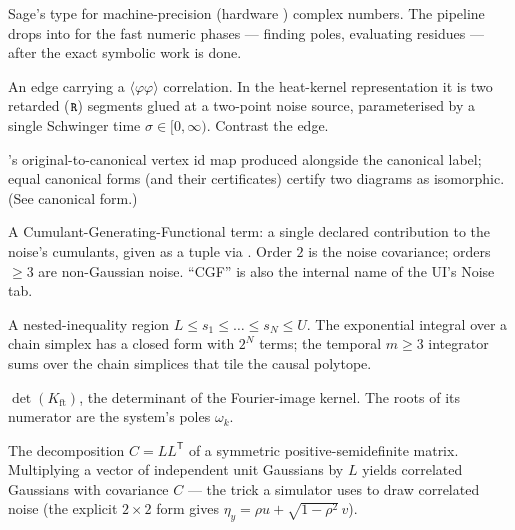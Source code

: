 \begin{description}[leftmargin=0pt,style=nextline]
  \item[\code{CDF} (Complex Double Field)] Sage's type for machine-precision
        (hardware ) complex numbers. The pipeline drops into 
        for the fast numeric phases --- finding poles, evaluating residues --- after
        the exact symbolic work is done.

  \item[\code{C} edge / correlation line] An edge carrying a
        $\langle\varphi\varphi\rangle$ correlation. In the heat-kernel
        representation it is two retarded ($\texttt{\small R}$) segments glued at a
        two-point noise source, parameterised by a single Schwinger time
        $\sigma\in[0,\infty)$. Contrast the  edge.

  \item[Certificate (\code{cert})] 's original-to-canonical vertex id
        map produced alongside the canonical label; equal canonical forms (and
        their certificates) certify two diagrams as isomorphic. (See canonical
        form.)

  \item[CGF / CGF term / CGF row] A Cumulant-Generating-Functional term: a single
        declared contribution to the noise's cumulants, given as a tuple
         via
        . Order $2$ is the noise covariance; orders
        $\ge 3$ are non-Gaussian noise. ``CGF'' is also the internal name of the
        UI's Noise tab.

  \item[Chain simplex] A nested-inequality region
        $L \le s_1 \le \dots \le s_N \le U$. The exponential integral over a chain
        simplex has a closed form with $2^{N}$ terms; the temporal $m\ge 3$
        integrator sums over the chain simplices that tile the causal polytope.

  \item[Characteristic polynomial / \code{D\_omega}] $\det(K_{\mathrm{ft}})$, the
        determinant of the Fourier-image kernel. The roots of its numerator are the
        system's poles $\omega_k$.

  \item[Cholesky factorization] The decomposition $C=LL^{\mathsf T}$ of a symmetric
        positive-semidefinite matrix. Multiplying a vector of independent unit
        Gaussians by $L$ yields correlated Gaussians with covariance $C$ --- the
        trick a simulator uses to draw correlated noise (the explicit $2\times2$
        form gives $\eta_y=\rho u + \sqrt{1-\rho^{2}}\,v$).


\end{description}
